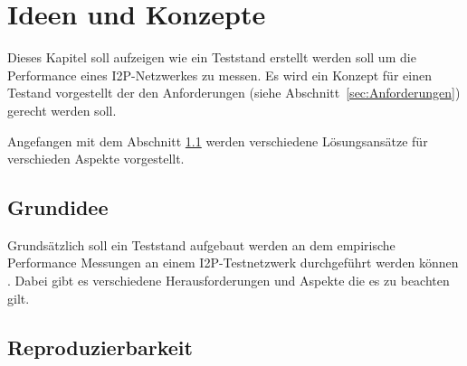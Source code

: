 \chapter{Ideen und Konzepte}

Dieses Kapitel soll aufzeigen wie ein Teststand erstellt werden soll um die Performance eines I2P-Netzwerkes zu messen. Es wird ein Konzept für einen Testand vorgestellt der den Anforderungen (siehe Abschnitt~\ref{sec:Anforderungen}) gerecht werden soll.

Angefangen mit dem Abschnitt \ref{sec:grundidee} werden verschiedene Lösungsansätze für verschieden Aspekte vorgestellt.

\section{Grundidee}\label{sec:grundidee}



Grundsätzlich soll ein Teststand aufgebaut werden an dem empirische Performance Messungen an einem I2P-Testnetzwerk durchgeführt werden können .
Dabei gibt es verschiedene Herausforderungen und Aspekte die es zu beachten gilt.


\section{Reproduzierbarkeit}

